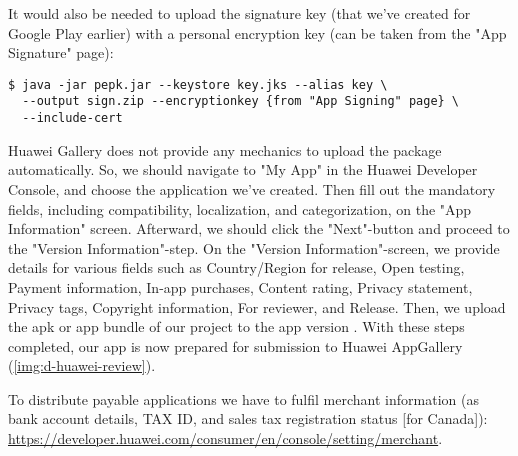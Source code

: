 It would also be needed to upload the signature key (that we've created for Google Play earlier) with a 
personal encryption key (can be taken from the "App Signature" page):

\begin{lstlisting}[language=terminal]
$ java -jar pepk.jar --keystore key.jks --alias key \
  --output sign.zip --encryptionkey {from "App Signing" page} \
  --include-cert
\end{lstlisting}


\noindent Huawei Gallery does not provide any mechanics to upload the package automatically. So, we should navigate to 
"My App" in the Huawei Developer Console, and choose the application we've created. Then fill out the mandatory fields, 
including compatibility, localization, and categorization, on the "App Information" screen. Afterward, we should click 
the "Next"-button and proceed to the "Version Information"-step. On the "Version Information"-screen, we provide details 
for various fields such as Country/Region for release, Open testing, Payment information, In-app purchases, Content 
rating, Privacy statement, Privacy tags, Copyright information, For reviewer, and Release. Then, we upload the apk or 
app bundle of our project to the app version \issue{286}{}. With these steps completed, our app is now prepared for 
submission to Huawei AppGallery (\cref{img:d-huawei-review}).


\noindent To distribute payable applications we have to fulfil merchant information (as bank account details, TAX ID, 
and sales tax registration status [for Canada]):
\href{https://developer.huawei.com/consumer/en/console/setting/merchant}{https://developer.huawei.com/consumer/en/console/setting/merchant}.
